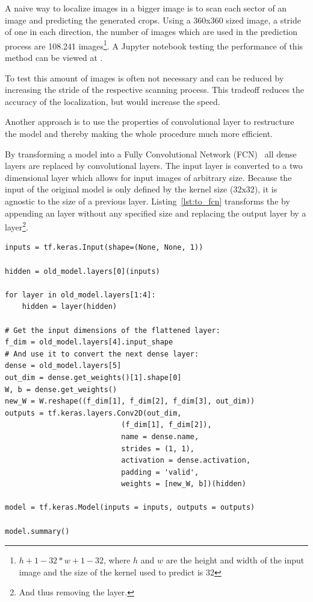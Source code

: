 A naive way to localize images in a bigger image is to scan each sector of an image and predicting the generated crops.
Using a 360x360 sized image, a stride of one in each direction, the number of images which are used in the prediction process are 108.241 images\footnote{$h + 1 - 32 * w + 1 - 32$, where $h$ and $w$ are the height and width of the input image and the size of the kernel used to predict is 32}.
A Jupyter notebook testing the performance of this method can be viewed at .

To test this amount of images is often not necessary and can be reduced by increasing the stride of the respective scanning process.
This tradeoff reduces the accuracy of the localization, but would increase the speed.

Another approach is to use the properties of convolutional layer to restructure the model and thereby making the whole procedure much more efficient.

By transforming a model into a Fully Convolutional Network (FCN)~\cite{Long2014} all dense layers are replaced by convolutional layers.
The input layer is converted to a two dimensional layer which allows for input images of arbitrary size.
Because the input of the original model is only defined by the kernel size (32x32), it is agnostic to the size of a previous layer.
Listing~\ref{lst:to_fcn} transforms the  by appending an  layer without any specified size and replacing the output layer by a  layer\footnote{And thus removing the  layer.}.

\begin{lstlisting}[caption={Transformation of the Symbol Classifier into a FCN.}, label=lst:to_fcn]
inputs = tf.keras.Input(shape=(None, None, 1))

hidden = old_model.layers[0](inputs)

for layer in old_model.layers[1:4]:
    hidden = layer(hidden)

# Get the input dimensions of the flattened layer:
f_dim = old_model.layers[4].input_shape
# And use it to convert the next dense layer:
dense = old_model.layers[5]
out_dim = dense.get_weights()[1].shape[0]
W, b = dense.get_weights()
new_W = W.reshape((f_dim[1], f_dim[2], f_dim[3], out_dim))
outputs = tf.keras.layers.Conv2D(out_dim,
                           (f_dim[1], f_dim[2]),
                           name = dense.name,
                           strides = (1, 1),
                           activation = dense.activation,
                           padding = 'valid',
                           weights = [new_W, b])(hidden)

model = tf.keras.Model(inputs = inputs, outputs = outputs)

model.summary()
\end{lstlisting}

